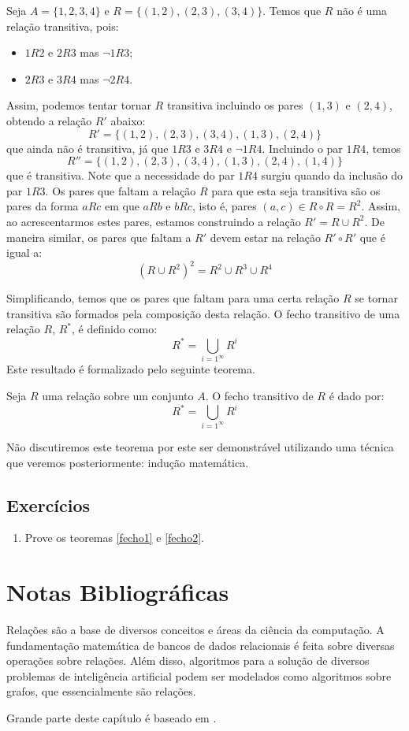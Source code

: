 \begin{Example}
Seja $A = \{1,2,3,4\}$ e $R =\{(1,2),(2,3),(3,4)\}$. Temos que $R$ não
é uma relação transitiva, pois:
\begin{itemize}
  \item $1R2$ e $2R3$ mas $\neg 1R3$;
  \item $2R3$ e $3R4$ mas $\neg 2R4$.
\end{itemize}
Assim, podemos tentar tornar $R$ transitiva incluindo os pares $(1,3)$
e $(2,4)$, obtendo a relação $R'$ abaixo:
\[
R' = \{(1,2),(2,3),(3,4),(1,3),(2,4)\}
\]
que ainda não é transitiva, já que $1R3$ e $3R4$ e $\neg
1R4$. Incluindo o par $1R4$, temos
\[
R'' = \{(1,2),(2,3),(3,4),(1,3),(2,4),(1,4)\}
\]
que é transitiva.
Note
que a necessidade do par $1R4$ surgiu quando da inclusão do par
$1R3$. Os pares que faltam a relação $R$ para que esta seja transitiva
são os pares  da forma $aRc$ em que $aRb$ e $bRc$, isto é, pares
$(a,c)\in R \circ R = R^2$. Assim, ao acrescentarmos estes pares,
estamos construindo a relação $R'= R \cup R^2$. De maneira similar, os
pares que faltam a $R'$ devem estar na relação $R' \circ R'$ que é
igual a:
\[
(R\cup R^2)^2 = R^2 \cup R^3 \cup R^4
\]
\end{Example}
Simplificando, temos que os pares que faltam para uma certa relação
$R$ se tornar transitiva são formados pela composição desta
relação. O fecho transitivo de uma relação $R$, $R^*$, é definido
como:
\[
R^* = \bigcup_{i = 1^\infty}R^i
\]
Este resultado é formalizado pelo seguinte teorema.
\begin{Theorem}
Seja $R$ uma relação sobre um conjunto $A$. O fecho transitivo de $R$
é dado por:
\[
R^* = \bigcup_{i = 1^\infty}R^i
\]
\end{Theorem}

Não discutiremos este teorema por este ser demonstrável utilizando uma
técnica que veremos posteriormente: indução matemática.

\subsection{Exercícios}

\begin{enumerate}
  \item Prove os teoremas \ref{fecho1} e \ref{fecho2}.
\end{enumerate}


\section{Notas Bibliográficas}

Relações são a base de diversos conceitos e áreas da ciência da
computação. A fundamentação matemática de bancos de dados relacionais
é feita sobre diversas operações sobre relações. Além disso,
algoritmos para a solução de diversos problemas de inteligência
artificial podem ser modelados como algoritmos sobre grafos, que
essencialmente são relações.

Grande parte deste capítulo é baseado em \cite{Velleman06}.